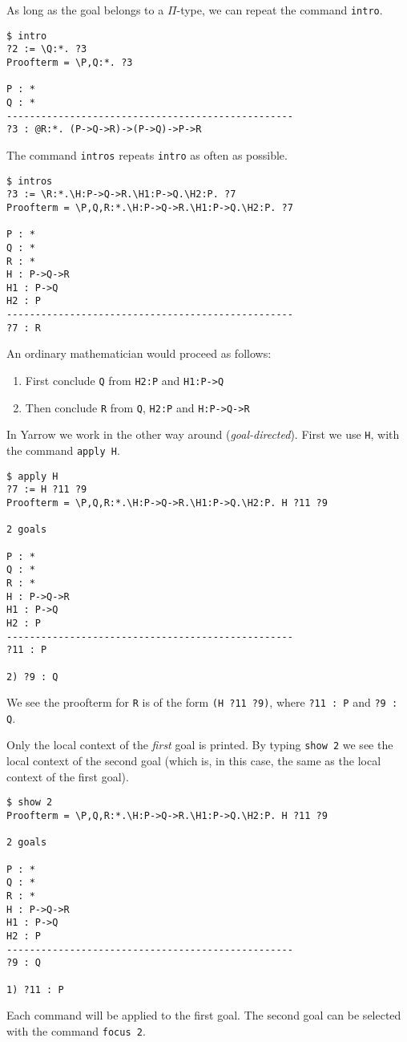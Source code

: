 As long as the goal belongs to a $\Pi$-type,
we can repeat the command {\tt intro}.
\begin{verbatim}
$ intro
?2 := \Q:*. ?3
Proofterm = \P,Q:*. ?3

P : *
Q : *
--------------------------------------------------
?3 : @R:*. (P->Q->R)->(P->Q)->P->R
\end{verbatim}
The command {\tt intros} repeats {\tt intro} as often as possible.
\begin{verbatim}
$ intros
?3 := \R:*.\H:P->Q->R.\H1:P->Q.\H2:P. ?7
Proofterm = \P,Q,R:*.\H:P->Q->R.\H1:P->Q.\H2:P. ?7

P : *
Q : *
R : *
H : P->Q->R
H1 : P->Q
H2 : P
--------------------------------------------------
?7 : R
\end{verbatim}
An ordinary mathematician would proceed as follows:
\begin{enumerate}
\item
First conclude 
{\tt Q}
from
{\tt H2:P}
and
{\tt H1:P->Q}
\item
Then conclude
{\tt R}
from
{\tt Q},
{\tt H2:P}
and
{\tt H:P->Q->R}
\end{enumerate}
In Yarrow we work in the other way around ({\em goal-directed}).
First we use {\tt H},
with the command {\tt apply H}.
\begin{verbatim}
$ apply H
?7 := H ?11 ?9
Proofterm = \P,Q,R:*.\H:P->Q->R.\H1:P->Q.\H2:P. H ?11 ?9

2 goals

P : *
Q : *
R : *
H : P->Q->R
H1 : P->Q
H2 : P
--------------------------------------------------
?11 : P

2) ?9 : Q
\end{verbatim}
We see the proofterm for {\tt R} is of the form 
{\tt (H ?11 ?9)}, where {\tt ?11 : P} and {\tt ?9 : Q}.

Only the local context of the {\em first} goal is printed.
By typing {\tt show 2} we see the local context of the second goal
(which is, in this case, the same as the local context of the first goal).
\begin{verbatim}
$ show 2
Proofterm = \P,Q,R:*.\H:P->Q->R.\H1:P->Q.\H2:P. H ?11 ?9

2 goals

P : *
Q : *
R : *
H : P->Q->R
H1 : P->Q
H2 : P
--------------------------------------------------
?9 : Q

1) ?11 : P
\end{verbatim}
Each command will be applied to the first goal.
The second goal can be selected with the command {\tt focus 2}.

